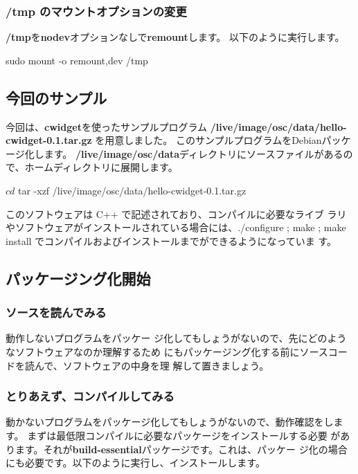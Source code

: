 \documentclass[mingoth,a4paper]{jsarticle}
\begin{document}
\subsubsection{/tmp のマウントオプションの変更}
{\bf /tmp}を{\bf nodev}オプションなしで{\bf remount}します。
以下のように実行します。
\begin{commandline}
sudo mount -o remount,dev /tmp
\end{commandline}

\subsection{今回のサンプル}
今回は、{\bf cwidget}を使ったサンプルプログラム
{\bf /live/image/osc/data/hello-cwidget-0.1.tar.gz}
を用意しました。
このサンプルプログラムをDebianパッケージ化します。
{\bf /live/image/osc/data}ディレクトリにソースファイルがあるので、ホームディレクトリに展開します。
\begin{commandline}
$ cd
$ tar -xzf /live/image/osc/data/hello-cwidget-0.1.tar.gz
\end{commandline}

このソフトウェアは C++ で記述されており、コンパイルに必要なライブ
ラリやソフトウェアがインストールされている場合には、./configure ; make ;
make install でコンパイルおよびインストールまでができるようになっていま
す。

\subsection{パッケージング化開始}
\subsubsection{ソースを読んでみる}
動作しないプログラムをパッケー
ジ化してもしょうがないので、先にどのようなソフトウェアなのか理解するため
にもパッケージング化する前にソースコードを読んで、ソフトウェアの中身を理
解して置きましょう。

\subsubsection{とりあえず、コンパイルしてみる}
動かないプログラムをパッケージ化してもしょうがないので、動作確認をします。
まずは最低限コンパイルに必要なパッケージをインストールする必要
があります。それが{\bf build-essential}パッケージです。これは、パッケー
ジ化の場合にも必要です。以下のように実行し、インストールします。
\end{document}
